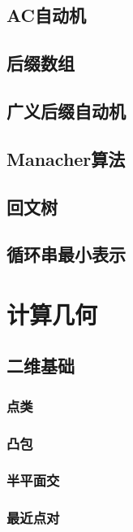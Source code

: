 \documentclass[openany, a4paper, 10pt]{book}
\begin{document}
\begin{spacing}{1.0}
		\section{AC自动机}
			
		\section{后缀数组}
			
		\section{广义后缀自动机}
			
		\section{Manacher算法}
			
		\section{回文树}
			
		\section{循环串最小表示}
			
	\chapter{计算几何}
		\section{二维基础}
			\subsection{点类}
				
			\subsection{凸包}
				
			\subsection{半平面交}
				
			\subsection{最近点对}
				

\end{spacing}
\end{document}
